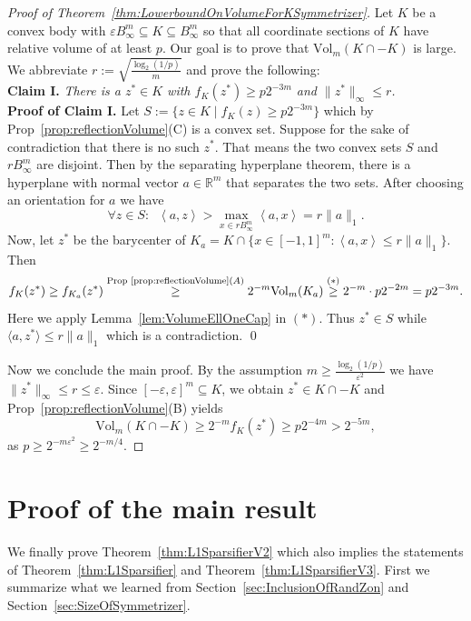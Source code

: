 \documentclass[12pt,english]{article}
\theoremstyle{theorem}
\theoremstyle{remark}
\providecommand{\setR}{\mathbb{R}}
\newcommand{\Vol}{\mathrm{Vol}}
\newcommand{\eps}{\varepsilon}
\begin{document}
\begin{proof}[Proof of Theorem~\ref{thm:LowerboundOnVolumeForKSymmetrizer}]
  Let $K$ be a convex body with $\varepsilon B_{\infty}^m \subseteq K \subseteq B_{\infty}^m$ so that all coordinate sections of $K$ have relative volume of at least $p$.
  Our goal is to prove that $\Vol_m(K \cap -K)$ is large. We abbreviate $r := \sqrt{\frac{\log_2(1/p)}{m}}$ and prove the following: \\
  {\bf Claim I.} \emph{There is a $z^* \in K$ with $f_K(z^*) \geq p2^{-3m}$ and $\|z^*\|_{\infty} \leq r$.} \\
  {\bf Proof of Claim I.} Let $S := \{ z \in K \mid f_K(z) \geq p2^{-3m}\}$ which by Prop~\ref{prop:reflectionVolume}(C) is a convex set. Suppose for the sake of contradiction that there is no such $z^*$. That means the two convex sets $S$ and $r B_{\infty}^m$ are disjoint. Then by the separating hyperplane theorem, there is a hyperplane with normal vector $a \in \setR^m$ that separates the two sets. After choosing an orientation for $a$ we have
  \[
 \forall z \in S:  \;\; \left<a,z\right> > \max_{x \in rB_{\infty}^m} \left<a,x\right> = r \|a\|_{1}.
  \]
 Now, let $z^*$ be the barycenter of $K_a = K \cap \{ x \in [-1,1]^m : \left<a,x\right> \leq r\|a\|_1\}$. Then
  \[
   f_K(z^*) \geq f_{K_a}(z^*) \stackrel{\textrm{Prop~\ref{prop:reflectionVolume}}(A)}{\geq} 2^{-m}\Vol_m(K_a) \stackrel{(*)}{\geq} 2^{-m} \cdot p 2^{-2m} = p2^{-3m}.
 \]
 Here we apply Lemma~\ref{lem:VolumeEllOneCap} in $(*)$.
 Thus $z^* \in S$ while $\langle a, z^*\rangle \le r\|a\|_1$ which is a contradiction. \qed

 Now we conclude the main proof. By the assumption $m \ge \frac{\log_2(1/p)}{\eps^2}$ we have $\|z^*\|_\infty \le r \le \eps$. Since $[-\eps,\eps]^m \subseteq K$, we obtain $z^* \in K \cap -K$ and Prop~\ref{prop:reflectionVolume}(B) yields
 \[
   \Vol_m (K \cap -K) \ge 2^{-m} f_K (z^*) \ge p 2^{-4m} > 2^{-5m},
 \]
 as $p \ge 2^{-m\eps^2} \ge 2^{-m/4}$.
\end{proof}


\section{Proof of the main result} \label{sec:ProofOfLinSizeSparsifier}
We finally prove Theorem~\ref{thm:L1SparsifierV2} which also implies
the statements of Theorem~\ref{thm:L1Sparsifier} and Theorem~\ref{thm:L1SparsifierV3}. First we summarize what we learned from Section~\ref{sec:InclusionOfRandZon} and Section~\ref{sec:SizeOfSymmetrizer}.
\end{document}
